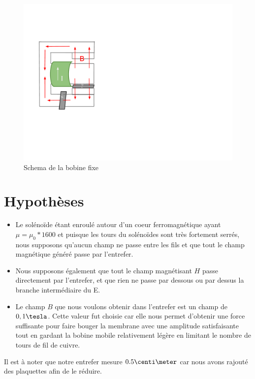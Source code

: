 \begin{figure}	
\begin{center}
\includegraphics[scale=0.5]{img/schema-aimant-bobine}
\end{center}
\caption{Schema de la bobine fixe}		
\label{fig:bobinefixe}		
\end{figure}

\section{Hypothèses}
\begin{itemize}
\item Le solénoïde étant enroulé autour d'un coeur ferromagnétique ayant $\mu = \mu_0 * 1600$ et puisque les 
tours du solénoïdes sont très fortement serrés, nous supposons qu'aucun champ ne passe entre les fils et que tout le champ magnétique généré passe par l'entrefer.
\item Nous supposons également que tout le champ magnétisant $H$ passe directement par l'entrefer, et que rien ne passe par dessous ou par dessus la branche intermédiaire du E.
\item Le champ $B$ que nous voulons obtenir dans l'entrefer est un champ de $0,1\tesla$. Cette valeur fut choisie car elle nous permet d'obtenir une force suffisante pour faire bouger la membrane avec une amplitude satisfaisante tout en gardant la bobine 
mobile relativement légère en limitant le nombre de tours de fil de cuivre.
\end{itemize}
Il est à noter que notre entrefer mesure $0.5\centi\meter$ car nous avons rajouté des plaquettes afin de le réduire.

